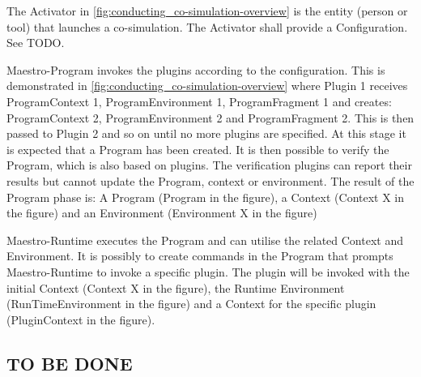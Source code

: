 The Activator in \cref{fig:conducting_co-simulation-overview} is the entity
(person or tool) that launches a co-simulation. The Activator shall provide a
Configuration. See TODO.

Maestro-Program invokes the plugins according to the configuration. This
is demonstrated in \cref{fig:conducting_co-simulation-overview} where Plugin 1
receives ProgramContext 1, ProgramEnvironment 1, ProgramFragment 1 and
creates: ProgramContext 2, ProgramEnvironment 2 and ProgramFragment 2. This is
then passed to Plugin 2 and so on until no more plugins are specified. At this
stage it is expected that a Program has been created. It is then possible to
verify the Program, which is also based on plugins. The verification plugins can
report their results but cannot update the Program, context or environment. The
result of the Program phase is:
A Program (Program in the figure), a Context (Context X in the figure) and an Environment (Environment X
in the figure)

Maestro-Runtime executes the Program and can utilise the related Context and Environment.
It is possibly to create commands in
the Program that prompts Maestro-Runtime to invoke a specific plugin. The plugin
will be invoked with the initial Context (Context X in the figure), the Runtime
Environment (RunTimeEnvironment in the figure) and a Context for the specific plugin (PluginContext in the figure).



\subsection{TO BE DONE}
\begin{itemize}

\end{itemize}

